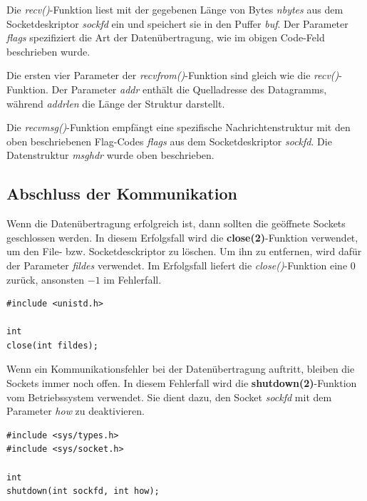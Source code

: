 Die \textit{recv()}-Funktion liest mit der gegebenen Länge von Bytes \textit{nbytes} aus dem Socketdeskriptor \textit{sockfd} ein und speichert sie in den Puffer \textit{buf}. Der Parameter \textit{flags} spezifiziert die Art der Datenübertragung, wie im obigen Code-Feld beschrieben wurde. \smallskip \smallskip

Die ersten vier Parameter der \textit{recvfrom()}-Funktion sind gleich wie die \textit{recv()}-Funktion. Der Parameter \textit{addr} enthält die Quelladresse des Datagramms, während \textit{addrlen} die Länge der Struktur darstellt. \smallskip \smallskip

Die \textit{recvmsg()}-Funktion empfängt eine spezifische Nachrichtenstruktur mit den oben beschriebenen Flag-Codes \textit{flags} aus dem Socketdeskriptor \textit{sockfd}. Die Datenstruktur \textit{msghdr} wurde oben beschrieben.

\subsection{Abschluss der Kommunikation}

Wenn die Datenübertragung erfolgreich ist, dann sollten die geöffnete Sockets geschlossen werden. In diesem Erfolgsfall wird die \textbf{close(2)}-Funktion verwendet, um den File- bzw. Socketdesckriptor zu löschen. Um ihn zu entfernen, wird dafür der Parameter \textit{fildes} verwendet. Im Erfolgsfall liefert die \textit{close()}-Funktion eine $0$ zurück, ansonsten $-1$ im Fehlerfall. \smallskip \smallskip

\begin{verbatim}
#include <unistd.h>

int
close(int fildes);
\end{verbatim}

Wenn ein Kommunikationsfehler bei der Datenübertragung auftritt, bleiben die Sockets immer noch offen. In diesem Fehlerfall wird die \textbf{shutdown(2)}-Funktion vom Betriebssystem verwendet. Sie dient dazu, den Socket \textit{sockfd} mit dem Parameter \textit{how} zu deaktivieren. \smallskip \smallskip

\begin{verbatim}
#include <sys/types.h>
#include <sys/socket.h>

int
shutdown(int sockfd, int how);
\end{verbatim}


